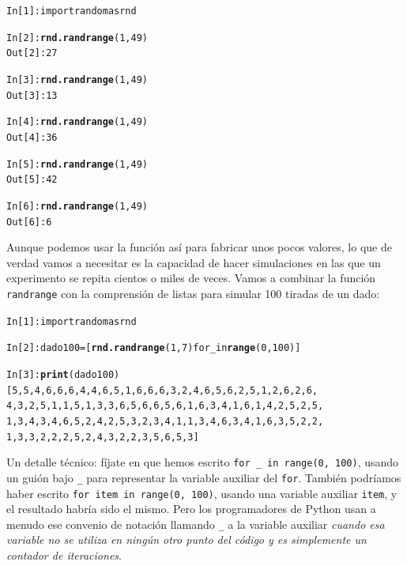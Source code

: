\documentclass[10pt,a4paper]{article}\usepackage[]{graphicx}\usepackage[]{color}
\makeatletter
\newcommand{\hlkwd}[1]{\textcolor[rgb]{0.737,0.353,0.396}{\textbf{#1}}}%
\newenvironment{kframe}{%
 \def\at@end@of@kframe{}%
 \ifinner\ifhmode%
  \def\at@end@of@kframe{\end{minipage}}%
  \begin{minipage}{\columnwidth}%
 \fi\fi%
 \def\FrameCommand##1{\hskip\@totalleftmargin \hskip-\fboxsep
 \colorbox{shadecolor}{##1}\hskip-\fboxsep
     \hskip-\linewidth \hskip-\@totalleftmargin \hskip\columnwidth}%
 \MakeFramed {\advance\hsize-\width
   \@totalleftmargin\z@ \linewidth\hsize
   \@setminipage}}%
 {\par\unskip\endMakeFramed%
 \at@end@of@kframe}
\newenvironment{knitrout}{}{} %
\newcounter {cont01}
\makeatother
\begin{document}
\begin{knitrout}
\color{fgcolor}\begin{kframe}
\begin{alltt}
In [1]: import random as rnd

In [2]: \hlkwd{rnd.randrange}(1, 49)
Out[2]: 27

In [3]: \hlkwd{rnd.randrange}(1, 49)
Out[3]: 13

In [4]: \hlkwd{rnd.randrange}(1, 49)
Out[4]: 36

In [5]: \hlkwd{rnd.randrange}(1, 49)
Out[5]: 42

In [6]: \hlkwd{rnd.randrange}(1, 49)
Out[6]: 6
\end{alltt}
\end{kframe}
\end{knitrout}
Aunque podemos usar la función así para fabricar unos pocos valores, lo que de verdad vamos a necesitar es la capacidad de hacer simulaciones en las que un experimento se repita cientos o miles de veces. Vamos a combinar la función {\tt randrange} con la comprensión de listas para simular 100 tiradas de un dado:
\begin{knitrout}
\color{fgcolor}\begin{kframe}
\begin{alltt}
In [1]: import random as rnd

In [2]: dado100 = [\hlkwd{rnd.randrange}(1, 7) for _ in \hlkwd{range}(0, 100)]

In [3]: \hlkwd{print}(dado100)
[5, 5, 4, 6, 6, 6, 4, 4, 6, 5, 1, 6, 6, 6, 3, 2, 4, 6, 5, 6, 2, 5, 1, 2, 6, 2, 6,
4, 3, 2, 5, 1, 1, 5, 1, 3, 3, 6, 5, 6, 6, 5, 6, 1, 6, 3, 4, 1, 6, 1, 4, 2, 5, 2, 5,
1, 3, 4, 3, 4, 6, 5, 2, 4, 2, 5, 3, 2, 3, 4, 1, 1, 3, 4, 6, 3, 4, 1, 6, 3, 5, 2, 2,
1, 3, 3, 2, 2, 2, 5, 2, 4, 3, 2, 2, 3, 5, 6, 5, 3]
\end{alltt}
\end{kframe}
\end{knitrout}
Un detalle técnico: fíjate en que hemos escrito \verb&for _ in range(0, 100)&, usando un guión bajo \verb&_& para representar la variable auxiliar del {\tt for}. También podríamos haber escrito {\tt for item in range(0, 100)}, usando una variable auxiliar {\tt item}, y el resultado habría sido el mismo. Pero los programadores de Python usan a menudo ese convenio de notación llamando \verb&_& a la variable auxiliar {\em cuando esa variable no se utiliza en ningún otro punto del código y es simplemente un contador de iteraciones}.
\end{document}
